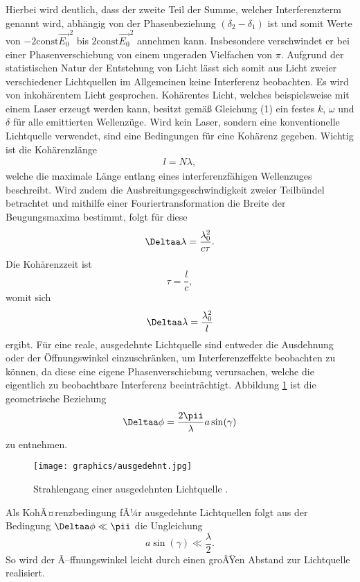 \noindent Hierbei wird deutlich, dass der zweite Teil der Summe, welcher Interferenzterm genannt wird, abhängig von der
Phasenbeziehung $(\delta_\text{2} - \delta_\text{1})$ ist und somit Werte von $-2 \mathrm{const} \vec{E_\text{0}}^{2}$ bis 
$2 \mathrm{const} \vec{E_\text{0}}^{2}$ annehmen kann. Insbesondere verschwindet er bei einer Phasenverschiebung von einem
ungeraden Vielfachen von $\pi$. Aufgrund der statistischen Natur der Entstehung von Licht lässt sich somit aus Licht
zweier verschiedener Lichtquellen im Allgemeinen keine Interferenz beobachten. Es wird von inkohärentem Licht gesprochen.
Kohärentes Licht, welches beispielsweise mit einem Laser erzeugt werden kann, besitzt gemäß Gleichung (1) ein festes $k$, 
$\omega$ und $\delta$ für alle emittierten Wellenzüge. Wird kein Laser, sondern eine konventionelle Lichtquelle verwendet,
sind eine Bedingungen für eine Kohärenz gegeben. Wichtig ist die Kohärenzlänge 
\begin{align}
l = N \lambda,
\end{align}
welche die maximale Länge entlang eines interferenzfähigen Wellenzuges beschreibt. Wird zudem die Ausbreitungsgeschwindigkeit 
zweier Teilbündel betrachtet und mithilfe einer Fouriertransformation die Breite der Beugungsmaxima bestimmt,
folgt für diese
\begin{equation*}
  \Deltaa \lambda = \frac{\lambda_0^2}{c \tau}.
\end{equation*}
Die Kohärenzzeit ist
\begin{equation*}
  \tau = \frac{l}{c},
\end{equation*}
womit sich
\begin{equation}
  \Deltaa \lambda = \frac{\lambda_0^2}{l}
\end{equation}
ergibt.
Für eine reale, ausgedehnte Lichtquelle sind entweder die Ausdehnung oder der Öffnungswinkel einzuschränken, um Interferenzeffekte beobachten zu können,
da diese eine eigene Phasenverschiebung verursachen, welche die eigentlich zu beobachtbare Interferenz beeinträchtigt.
Abbildung \ref{fig:ausgedehnt} ist die geometrische Beziehung
\begin{equation}
\Deltaa \phi = \frac{2\pii}{\lambda}a \sin(\gamma)
\end{equation}
zu entnehmen.
\begin{figure}
  \centering
  \texttt{[image: graphics/ausgedehnt.jpg]}
  \caption{Strahlengang einer ausgedehnten Lichtquelle \cite{Anleitung}.}
  \label{fig:ausgedehnt}
\end{figure}
Als KohÃ¤renzbedingung fÃ¼r ausgedehnte Lichtquellen folgt aus der Bedingung $\Deltaa \phi \ll \pii$ die Ungleichung
\begin{equation}
  a \sin(\gamma) \ll \frac{\lambda}{2}.
\end{equation}
So wird der Ã–ffnungswinkel leicht durch einen groÃŸen Abstand zur Lichtquelle realisiert.
